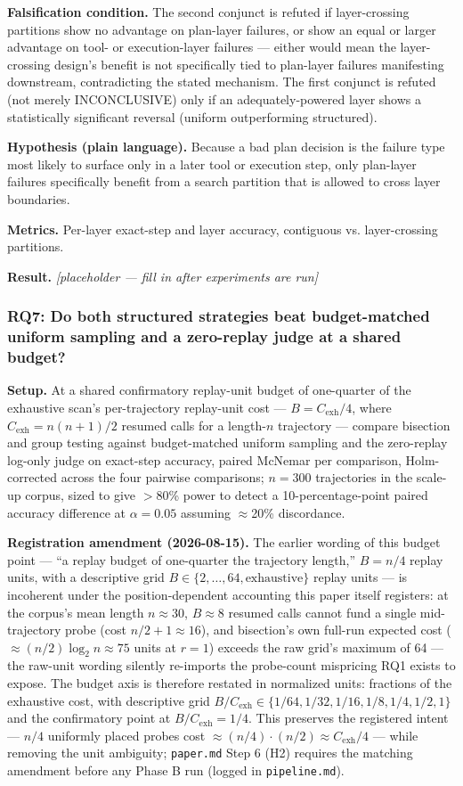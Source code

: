 \documentclass[11pt]{article}
\newcommand{\ph}{\textit{[placeholder --- fill in after experiments are run]}}
\begin{document}
\textbf{Falsification condition.} The second conjunct is refuted if layer-crossing partitions show no advantage on plan-layer failures, or show an equal or larger advantage on tool- or execution-layer failures --- either would mean the layer-crossing design's benefit is not specifically tied to plan-layer failures manifesting downstream, contradicting the stated mechanism. The first conjunct is refuted (not merely INCONCLUSIVE) only if an adequately-powered layer shows a statistically significant reversal (uniform outperforming structured).

\textbf{Hypothesis (plain language).} Because a bad plan decision is the failure type most likely to surface only in a later tool or execution step, only plan-layer failures specifically benefit from a search partition that is allowed to cross layer boundaries.

\textbf{Metrics.} Per-layer exact-step and layer accuracy, contiguous vs. layer-crossing partitions.

\textbf{Result.} \ph

\subsubsection{RQ7: Do both structured strategies beat budget-matched uniform sampling and a zero-replay judge at a shared budget?}
\textbf{Setup.} At a shared confirmatory replay-unit budget of one-quarter of the exhaustive scan's per-trajectory replay-unit cost --- $B = C_{\mathrm{exh}}/4$, where $C_{\mathrm{exh}} = n(n+1)/2$ resumed calls for a length-$n$ trajectory --- compare bisection and group testing against budget-matched uniform sampling and the zero-replay log-only judge on exact-step accuracy, paired McNemar per comparison, Holm-corrected across the four pairwise comparisons; $n=300$ trajectories in the scale-up corpus, sized to give $>$80\% power to detect a 10-percentage-point paired accuracy difference at $\alpha=0.05$ assuming $\approx$20\% discordance.

\textbf{Registration amendment (2026-08-15).} The earlier wording of this budget point --- ``a replay budget of one-quarter the trajectory length,'' $B = n/4$ replay units, with a descriptive grid $B \in \{2,\dots,64,\text{exhaustive}\}$ replay units --- is incoherent under the position-dependent accounting this paper itself registers: at the corpus's mean length $n \approx 30$, $B \approx 8$ resumed calls cannot fund a single mid-trajectory probe (cost $n/2+1 \approx 16$), and bisection's own full-run expected cost ($\approx (n/2)\log_2 n \approx 75$ units at $r=1$) exceeds the raw grid's maximum of 64 --- the raw-unit wording silently re-imports the probe-count mispricing RQ1 exists to expose. The budget axis is therefore restated in normalized units: fractions of the exhaustive cost, with descriptive grid $B/C_{\mathrm{exh}} \in \{1/64, 1/32, 1/16, 1/8, 1/4, 1/2, 1\}$ and the confirmatory point at $B/C_{\mathrm{exh}} = 1/4$. This preserves the registered intent --- $n/4$ uniformly placed probes cost $\approx (n/4)\cdot(n/2) \approx C_{\mathrm{exh}}/4$ --- while removing the unit ambiguity; \texttt{paper.md} Step 6 (H2) requires the matching amendment before any Phase B run (logged in \texttt{pipeline.md}).
\end{document}
